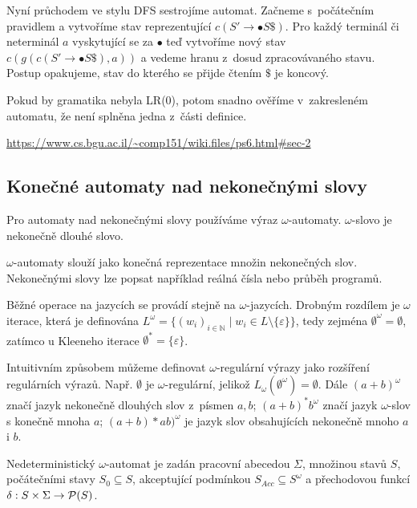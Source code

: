 Nyní průchodem ve stylu DFS sestrojíme automat. Začneme s~počátečním
pravidlem a vytvoříme stav reprezentující $c(S' \to \bullet S\$)$.
Pro každý terminál či neterminál $a$ vyskytující se
za $\bullet$ teď vytvoříme nový stav $c(g(c(S' \to \bullet S\$), a))$
a vedeme hranu z~dosud zpracovávaného stavu.
Postup opakujeme, stav do kterého se přijde čtením $\$$ je koncový.

Pokud by gramatika nebyla LR(0), potom snadno ověříme v~zakresleném
automatu, že není splněna jedna z~části definice.

\begin{example}
    \href{https://www.cs.bgu.ac.il/~comp151/wiki.files/ps6.html\#sec-2}
{https://www.cs.bgu.ac.il/{\textasciitilde}comp151/wiki.files/ps6.html\#sec-2}
\end{example}


\subsection{Konečné automaty nad nekonečnými slovy}


Pro automaty nad nekonečnými slovy používáme výraz $\omega$-automaty.
$\omega$-slovo je nekonečně dlouhé slovo.

$\omega$-automaty slouží jako konečná reprezentace množin nekonečných
slov. Nekonečnými slovy lze popsat například reálná čísla nebo průběh
programů.

Běžné operace na jazycích se provádí stejně na $\omega$-jazycích.
Drobným rozdílem je $\omega$ iterace, která je definována
$L^\omega = \{ (w_i)_{i \in \mathbb{N}} \mid w_i \in L \setminus \{ \varepsilon \} \}$,
tedy zejména
$\emptyset^\omega = \emptyset$, zatímco u Kleeneho iterace
$\emptyset^* = \{ \varepsilon \}$.

\begin{example}
    Intuitivním způsobem můžeme definovat
    $\omega$-regulární výrazy jako rozšíření regulárních výrazů.
    Např. $\emptyset$ je $\omega$-regulární, jelikož
    $L_\omega(\emptyset^\omega) = \emptyset$.
    Dále $(a+b)^\omega$ značí jazyk nekonečně dlouhých slov z~písmen
    $a,b$;
    $(a+b)^*b^\omega$ značí jazyk $\omega$-slov s konečně mnoha $a$;
    $(a+b)*ab)^\omega$ je jazyk slov obsahujících nekonečně mnoho $a$ i $b$.
\end{example}

\begin{definition}
    Nedeterministický $\omega$-automat je zadán
    pracovní abecedou $\Sigma$,
    množinou stavů $S$,
    počátečními stavy $S_0 \subseteq S$,
    akceptující podmínkou $S_{Acc} \subseteq S^\omega$
    a přechodovou funkcí $\delta : S \times \Sigma \to \mathcal{P}(S)$.
\end{definition}

